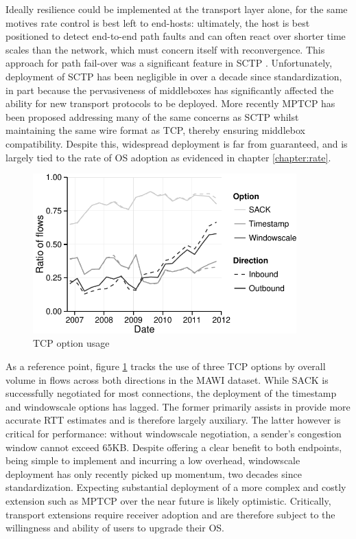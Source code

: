 Ideally resilience could be implemented at the transport layer alone, for the same motives rate control is best left to end-hosts: ultimately, the host is best positioned to detect end-to-end path faults and can often react over shorter time scales than the network, which must concern itself with reconvergence.
This approach for path fail-over was a significant feature in \ac{SCTP} \cite{rfc4960}.
Unfortunately, deployment of \ac{SCTP} has been negligible in over a decade since standardization, in part because the pervasiveness of middleboxes has significantly affected the ability for new transport protocols to be deployed.
More recently \ac{MPTCP} has been proposed addressing many of the same concerns as \ac{SCTP} whilst maintaining the same wire format as \ac{TCP}, thereby ensuring middlebox compatibility.
Despite this, widespread deployment is far from guaranteed, and is largely tied to the rate of \ac{OS} adoption as evidenced in chapter \ref{chapter:rate}.

\begin{figure}[t]
    \centering
    \includegraphics[width=4.0in]{figures/inflex/options}
    \caption{\acs{TCP} option usage \label{fig:wscale}}
    \hfill
\end{figure}

As a reference point, figure \ref{fig:wscale} tracks the use of three \ac{TCP} options by overall volume in flows across both directions in the \ac{MAWI} dataset.
While \ac{SACK} is successfully negotiated for most connections, the deployment of the timestamp and windowscale options has lagged.
The former primarily assists in provide more accurate \ac{RTT} estimates and is therefore largely auxiliary.
The latter however is critical for performance: without windowscale negotiation, a sender's congestion window cannot exceed 65KB.
Despite offering a clear benefit to both endpoints, being simple to implement and incurring a low overhead, windowscale deployment has only recently picked up momentum, two decades since standardization.
Expecting substantial deployment of a more complex and costly extension such as \ac{MPTCP} over the near future is likely optimistic.
Critically, transport extensions require receiver adoption and are therefore subject to the willingness and ability of users to upgrade their OS.

